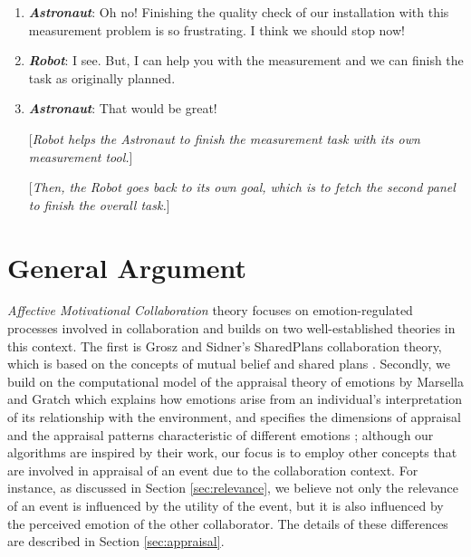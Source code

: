 \documentclass[12pt]{report}
\begin{document}
\begin{enumerate}
  \item \textit{\textbf{Astronaut}}: Oh no! Finishing the quality check of our
  installation with this measurement problem is so frustrating. I think we
  should stop now!

  \item \textit{\textbf{Robot}}: I see. But, I can help you with the measurement
  and we can finish the task as originally planned.

  \item \textit{\textbf{Astronaut}}: That would be great!

  [\textit{Robot helps the Astronaut to finish the measurement task with its
  own measurement tool.}]
  
  [\textit{Then, the Robot goes back to its own goal, which is to fetch the
  second panel to finish the overall task.}]

\end{enumerate}

\section{General Argument}

\textit{Affective Motivational Collaboration} theory focuses on
emotion-regulated processes involved in collaboration and builds on two
well-established theories in this context. The first is Grosz and Sidner's
SharedPlans collaboration theory, which is based on the concepts of mutual
belief and shared plans \cite{grosz:shared-plans, grosz:plans-discourse}.
Secondly, we build on the computational model of the appraisal theory of
emotions by Marsella and Gratch \cite{gratch:domain-independent,
gratch:evaluating, marsella:ema-process-model, marsella:computational} which
explains how emotions arise from an individual's interpretation of its
relationship with the environment, and specifies the dimensions of appraisal and
the appraisal patterns characteristic of different emotions
\cite{scherer:appraisal-processes}; {\color{red}although our algorithms are
inspired by their work, our focus is to employ other concepts that are
involved in appraisal of an event due to the collaboration context. For
instance, as discussed in Section \ref{sec:relevance}, we believe not only the
relevance of an event is influenced by the utility of the event, but it is also
influenced by the perceived emotion of the other collaborator. The details of
these differences are described in Section \ref{sec:appraisal}.}
\end{document}
